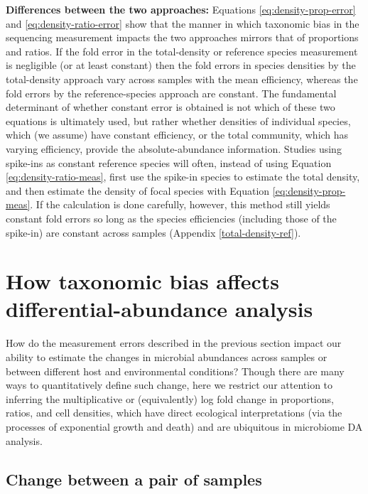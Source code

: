 \documentclass[
]{article}
\begin{document}
\textbf{Differences between the two approaches:}
Equations \eqref{eq:density-prop-error} and \eqref{eq:density-ratio-error} show that the manner in which taxonomic bias in the sequencing measurement impacts the two approaches mirrors that of proportions and ratios.
If the fold error in the total-density or reference species measurement is negligible (or at least constant) then the fold errors in species densities by the total-density approach vary across samples with the mean efficiency, whereas the fold errors by the reference-species approach are constant.
The fundamental determinant of whether constant error is obtained is not which of these two equations is ultimately used, but rather whether densities of individual species, which (we assume) have constant efficiency, or the total community, which has varying efficiency, provide the absolute-abundance information.
Studies using spike-ins as constant reference species will often, instead of using Equation \eqref{eq:density-ratio-meas}, first use the spike-in species to estimate the total density, and then estimate the density of focal species with Equation \eqref{eq:density-prop-meas}.
If the calculation is done carefully, however, this method still yields constant fold errors so long as the species efficiencies (including those of the spike-in) are constant across samples (Appendix \ref{total-density-ref}).

\hypertarget{differential-abundance}{%
\section{How taxonomic bias affects differential-abundance analysis}\label{differential-abundance}}

How do the measurement errors described in the previous section impact our ability to estimate the changes in microbial abundances across samples or between different host and environmental conditions?
Though there are many ways to quantitatively define such change, here we restrict our attention to inferring the multiplicative or (equivalently) log fold change in proportions, ratios, and cell densities, which have direct ecological interpretations (via the processes of exponential growth and death) and are ubiquitous in microbiome DA analysis.

\hypertarget{change-between-a-pair-of-samples}{%
\subsection{Change between a pair of samples}\label{change-between-a-pair-of-samples}}
\end{document}
